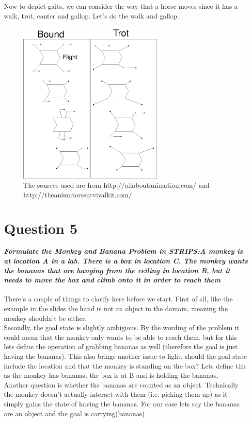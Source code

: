 \documentclass{article}
\newcommand\tab[1][1cm]{\hspace*{#1}}
\begin{document}
Now to depict gaits, we can consider the way that a horse moves since it has a walk,
trot, canter and gallop. Let's do the walk and gallop.
\begin{figure}[ht]
    \centering
    \includegraphics[width=0.65\textwidth]{img/gait-walk}
    \caption{The sources used are from http://allaboutanimation.com/ and 
    http://theanimatorssurvivalkit.com/}
\end{figure}
\section*{Question 5}
\textbf{\textit{
    \tab Formulate the Monkey and Banana Problem in STRIPS:A monkey is at location A in a lab. There is a box in location C. The monkey wants the bananas that are hanging from the ceiling in location B, but it needs to move the box and climb onto it in order to reach them
}} \\ \\
There's a couple of things to clarify here before we start. First of all, like
the example in the slides the hand is not an object in the domain, meaning the 
monkey shouldn't be either. \\
\tab Secondly, the goal state is slightly ambigious.
By the wording of the problem it could mean that the monkey only wants to be able
to reach them, but for this lets define the operation of grabbing bananas as well
(therefore the goal is just having the bananas).
This also brings another issue to light, should the goal state include the location
and that the monkey is standing on the box? Lets define this as the monkey has bananas, the box is at B and is holding the bananas. \\
\tab Another question is whether the bananas are counted as an object.
Technically the monkey doesn't actually interact with them (i.e. picking them up) as it simply gains the state of having the bananas. 
For our case lets say the bananas are an object and the goal is carrying(bananas) 
\end{document}
